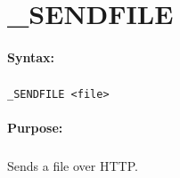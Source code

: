 
\newpage
\section{\_SENDFILE}
\label{cmd:_SENDFILE}

\paragraph{Syntax:}
\subparagraph{}
\texttt{\_SENDFILE <file>}

\paragraph{Purpose:}
\subparagraph{}
Sends a file over HTTP.